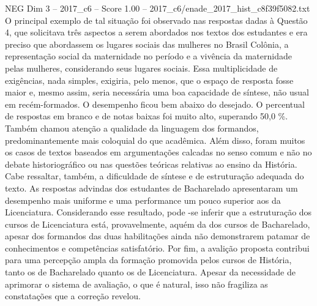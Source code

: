 \begin{textsample}{NEG Dim 3 – 2017\_c6 – Score 1.00 – 2017\_c6/enade\_2017\_hist\_c8f39f5082.txt}
O principal exemplo de tal situação foi observado nas respostas dadas à Questão 4, que solicitava três aspectos a serem abordados nos textos dos estudantes e era preciso que abordassem os lugares sociais das mulheres no Brasil Colônia, a representação social da maternidade no período e a vivência da maternidade pelas mulheres, considerando seus lugares sociais.
Essa multiplicidade de exigências, nada simples, exigiria, pelo menos, que o espaço de resposta fosse maior e, mesmo assim, seria necessária uma boa capacidade de síntese, não usual em recém-formados.
O desempenho ficou bem abaixo do desejado.
O percentual de respostas em branco e de notas baixas foi muito alto, superando 50,0 \%.
Também chamou atenção a qualidade da linguagem dos formandos, predominantemente mais coloquial do que acadêmica.
Além disso, foram muitos os casos de textos baseados em argumentações calcadas no senso comum e não no debate historiográfico ou nas questões teóricas relativas ao ensino da História.
Cabe ressaltar, também, a dificuldade de síntese e de estruturação adequada do texto.
As respostas advindas dos estudantes de Bacharelado apresentaram um desempenho mais uniforme e uma performance um pouco superior aos da Licenciatura.
Considerando esse resultado, pode -se inferir que a estruturação dos cursos de Licenciatura está, provavelmente, aquém da dos cursos de Bacharelado, apesar dos formandos das duas habilitações ainda não demonstrarem patamar de conhecimentos e competências satisfatório.
Por fim, a avalição proposta contribui para uma percepção ampla da formação promovida pelos cursos de História, tanto os de Bacharelado quanto os de Licenciatura.
Apesar da necessidade de aprimorar o sistema de avaliação, o que é natural, isso não fragiliza as constatações que a correção revelou.

\end{textsample}
